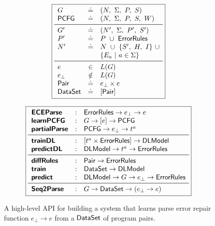 \begin{figure}[t]
\small
\begin{minipage}[t]{0.42\linewidth}
  \lstDeleteShortInline{|}
  \[
  \boxed{
  \begin{array}{lcl}
    G              & \defeq  & (N,\ \Sigma,\ P,\ S) \\
    \pcfgsym       & \defeq  & (N,\ \Sigma,\ P,\ S,\ W) \\
    \midrule
    G'             & \defeq  & (N',\ \Sigma,\ P',\ S') \\
    P'             & \defeq  & P\ \cup\ \errorrulessym \\
    N'             & \defeq  & N\ \cup\ \{S',\ H,\ I\}\ \cup\\
                   &         & \{E_a\ |\ a \in \Sigma\} \\
    \midrule
    e              & \in    & L(G) \\
    e_{\bot}       & \notin & L(G) \\
    \pairsym       & \defeq & e_{\bot} \times e \\
    \datasetsym    & \defeq & \List{\pairsym} \\
  \end{array}
  }
  \]
  \lstMakeShortInline[language=Python, mathescape=true]{|}
\end{minipage}
\begin{minipage}[t]{0.57\linewidth}
  \lstDeleteShortInline{|}
  \[
  \boxed{
  \begin{array}{lcl}
    \ecepsym       & : & \errorrulessym \to e_{\bot} \to e \\
    \learnPCFGsym  & : & G \to \List{e} \to \pcfgsym \\
    \partialsym    & : & \pcfgsym \to e_{\bot} \to t^a  \\
    \midrule
    \trainDLsym    & : & \List{t^a \times \errorrulessym} \to \Model \\
    \predictDLsym  & : & \Model \to t^a \to \errorrulessym \\
    \midrule
    \diffsym       & : & \pairsym \to \errorrulessym \\
    \trainsym      & : & \datasetsym \to \Model \\
    \predictsym    & : & \Model \to G \to e_{\bot} \to \errorrulessym \\
    \midrule
    \systemsym     & : & G \to \datasetsym \to (e_{\bot} \to e) \\
  \end{array}
  }
  \]
  \lstMakeShortInline[language=Python, mathescape=true]{|}
\end{minipage}
\caption{A high-level API for building a \toolname system that learns parse
error repair function $e_{\bot} \to e$ from a $\mathsf{DataSet}$ of program pairs.}
\label{fig:api}
\end{figure}
